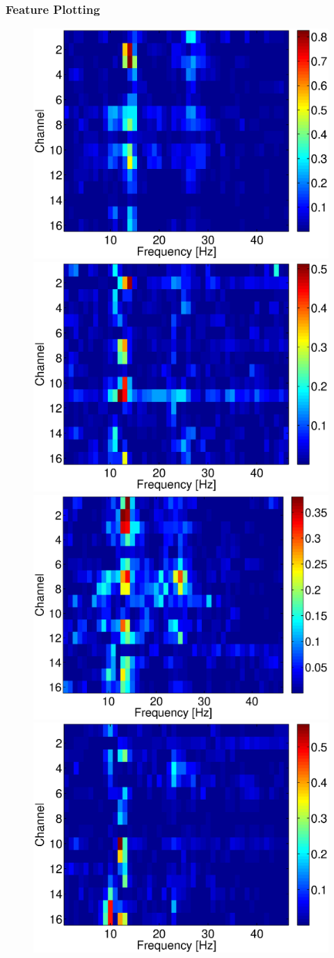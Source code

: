 \documentclass{beamer}
\begin{document}
\begin{frame}
\frametitle{Feature Plotting}
\begin{figure}

	\includegraphics[width=0.45\linewidth]{fig/VISsession1.eps}
\includegraphics[width=0.45\linewidth]{fig/VISsession2.eps} 
\qquad
\includegraphics[width=0.45\linewidth]{fig/FESsession1.eps}
\includegraphics[width=0.45\linewidth]{fig/FESsession2.eps}
	\end{figure}
\end{frame}
\end{document}
